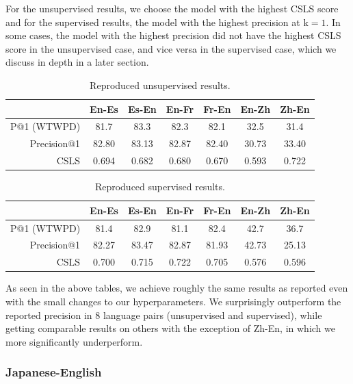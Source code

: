 \documentclass{article}
\begin{document}
For the unsupervised results, we choose the model with the highest CSLS score
and for the supervised results, the model with the highest precision at
$\text{k}=1$. In some cases, the model with the highest precision did not have
the highest CSLS score in the unsupervised case, and vice versa in the supervised
case, which we discuss in depth in a later section.

\begin{table}[h]
  \centering
  \begin{tabular}{r|cc|cc|cc}
    \toprule
    & En-Es & Es-En & En-Fr & Fr-En & En-Zh & Zh-En \\
    \midrule
    P@1 (WTWPD) & 81.7  & 83.3  & 82.3  & 82.1  & 32.5  & 31.4  \\
    \midrule
    Precision@1 & 82.80 & 83.13 & 82.87 & 82.40 & 30.73 & 33.40 \\
    CSLS        & 0.694 & 0.682 & 0.680 & 0.670 & 0.593 & 0.722 \\
    \bottomrule
  \end{tabular}
  \caption{Reproduced unsupervised results.}
\end{table}

\begin{table}[h]
  \centering
  \begin{tabular}{r|cc|cc|cc}
    \toprule
    & En-Es & Es-En & En-Fr & Fr-En & En-Zh & Zh-En \\
    \midrule
    P@1 (WTWPD) & 81.4  & 82.9  & 81.1  & 82.4  & 42.7  & 36.7  \\
    \midrule
    Precision@1 & 82.27 & 83.47 & 82.87 & 81.93 & 42.73 & 25.13 \\
    CSLS        & 0.700 & 0.715 & 0.722 & 0.705 & 0.576 & 0.596 \\
    \bottomrule
  \end{tabular}
  \caption{Reproduced supervised results.}
\end{table}

As seen in the above tables, we achieve roughly the same results as reported even
with the small changes to our hyperparameters. We surprisingly outperform the
reported precision in 8 language pairs (unsupervised and supervised), while getting
comparable results on others with the exception of Zh-En, in which we more 
significantly underperform.

\subsubsection*{Japanese-English}
\end{document}
